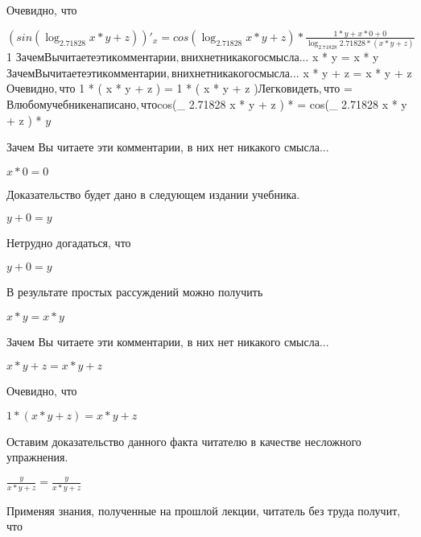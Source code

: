 \documentclass[12pt,a4paper,fleqn]{article}
\theoremstyle{definition}
\begin{document}
Очевидно, что 

$(sin(\log_{ 2.71828 }{ x  *  y  +  z }))'_{x} = cos(\log_{ 2.71828 }{ x  *  y  +  z }) * \frac{ 1  *  y  +  x  *  0  +  0 }{\log_{ 2.71828 }{ 2.71828 } * ( x  *  y  +  z )}
$
 1 $

Зачем Вы читаете эти комментарии, в них нет никакого смысла... 

$ x  *  y  =  x  *  y $

Зачем Вы читаете эти комментарии, в них нет никакого смысла... 

$ x  *  y  +  z  =  x  *  y  +  z $

Очевидно, что 

$ 1  * ( x  *  y  +  z ) =  1  * ( x  *  y  +  z )$

Легко видеть, что 

$
 = 
$

В любом учебнике написано, что 

$cos(\log_{ 2.71828 }{ x  *  y  +  z }) * 
 = cos(\log_{ 2.71828 }{ x  *  y  +  z }) * 
$
 y $

Зачем Вы читаете эти комментарии, в них нет никакого смысла... 

$ x  *  0  =  0 $

Доказательство будет дано в следующем издании учебника. 

$ y  +  0  =  y $

Нетрудно догадаться, что 

$ y  +  0  =  y $

В результате простых рассуждений можно получить 

$ x  *  y  =  x  *  y $

Зачем Вы читаете эти комментарии, в них нет никакого смысла... 

$ x  *  y  +  z  =  x  *  y  +  z $

Очевидно, что 

$ 1  * ( x  *  y  +  z ) =  x  *  y  +  z $

Оставим доказательство данного факта читателю в качестве несложного упражнения. 

$\frac{ y }{ x  *  y  +  z }
 = \frac{ y }{ x  *  y  +  z }
$

Применяя знания, полученные на прошлой лекции, читатель без труда получит, что 
\end{document}
